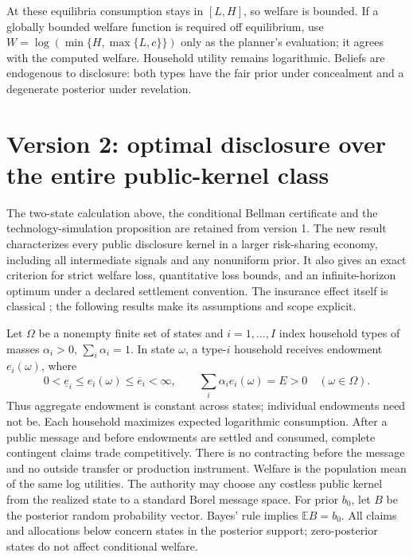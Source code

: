 \documentclass[11pt]{article}
\theoremstyle{remark}
\begin{document}
At these equilibria consumption stays in $[L,H]$, so welfare is bounded.
If a globally bounded welfare function is required off equilibrium, use
$W=\log(\min\{H,\max\{L,c\}\})$ only as the planner's evaluation;
it agrees with the computed welfare. Household utility remains logarithmic.
Beliefs are endogenous to disclosure: both types have the fair prior under
concealment and a degenerate posterior under revelation.


\section{Version 2: optimal disclosure over the entire public-kernel class}
The two-state calculation above, the conditional Bellman certificate and the
technology-simulation proposition are retained from version 1. The new result
characterizes every public disclosure kernel in a larger risk-sharing economy,
including all intermediate signals and any nonuniform prior. It also gives
an exact criterion for strict welfare loss, quantitative loss bounds, and an
infinite-horizon optimum under a declared settlement convention. The
insurance effect itself is classical \cite{hirshleifer}; the following
results make its assumptions and scope explicit.

Let $\Omega$ be a nonempty finite set of states and $i=1,\ldots,I$ index
household types of masses $\alpha_i>0$, $\sum_i\alpha_i=1$. In state
$\omega$, a type-$i$ household receives endowment $e_i(\omega)$, where
\[
 0<\underline e_i\leq e_i(\omega)\leq\overline e_i<\infty,
 \qquad \sum_i\alpha_i e_i(\omega)=E>0\quad(\omega\in\Omega).
\]
Thus aggregate endowment is constant across states; individual endowments
need not be. Each household maximizes expected logarithmic consumption.
After a public message and before endowments are settled and consumed, complete contingent
claims trade competitively. There is no contracting before the message and
no outside transfer or production instrument. Welfare is the population
mean of the same log utilities. The authority may choose any costless
public kernel from the realized state to a standard Borel message space.
For prior $b_0$, let $B$ be the posterior random probability vector. Bayes'
rule implies $\mathbb E B=b_0$. All claims and allocations below concern
states in the posterior support; zero-posterior states do not affect
conditional welfare.
\end{document}
